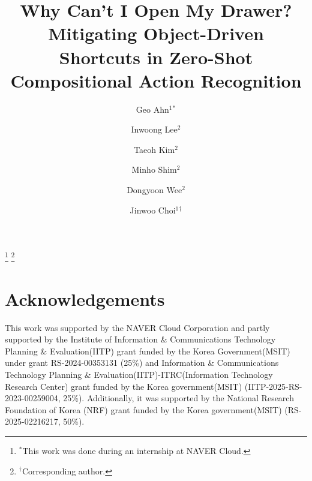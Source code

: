 \documentclass[runningheads]{llncs}
\begin{document}
\title{Why Can’t I Open My Drawer? \\
Mitigating Object-Driven Shortcuts in Zero-Shot Compositional Action Recognition} 


\author{
Geo Ahn${}^{1}{}^{*}$ \and
Inwoong Lee${}^{2}$ \and
Taeoh Kim${}^{2}$ \and
Minho Shim${}^{2}$ \and
Dongyoon Wee${}^{2}$ \and
Jinwoo Choi${}^{1}{}^{\dagger}$
}



\maketitle
\let\thefootnote\relax\footnote{
${}^{*}$This work was done during an internship at NAVER Cloud.}
\let\thefootnote\relax\footnote{
${}^{\dagger}$Corresponding author.}









\section*{Acknowledgements}
This work was supported by the NAVER Cloud Corporation and partly supported by the Institute of Information \& Communications Technology Planning \& Evaluation(IITP) grant funded by the Korea Government(MSIT) under grant RS-2024-00353131 (25\%) and Information \& Communications Technology Planning \& Evaluation(IITP)-ITRC(Information Technology Research Center) grant funded by the Korea government(MSIT) (IITP-2025-RS-2023-00259004, 25\%).
Additionally, it was supported by the National Research Foundation of Korea (NRF) grant funded by the Korea government(MSIT) (RS-2025-02216217, 50\%).




\clearpage

\end{document}
